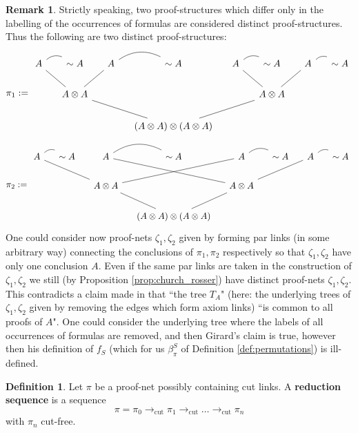 \documentclass[12pt]{article}
\theoremstyle{plain}
\theoremstyle{definition}
\newtheorem{defn}[thm]{Definition} %
\newtheorem{remark}[thm]{Remark}
\newcommand{\lto}{\longrightarrow}
\newcommand{\negation}{\sim}
\begin{document}
\begin{remark}
Strictly speaking, two proof-structures which differ only in the labelling of the occurrences of formulas are considered distinct proof-structures. Thus the following are two distinct proof-structures:
\begin{equation}\label{eq:counter_one}
\pi_1 :=
\begin{tikzcd}[column sep = small]
A\arrow[r,dash,bend left]\arrow[dr,dash] & \negation A & A\arrow[r,dash,bend left]\arrow[dl,dash] & \negation A & A\arrow[r,dash,bend left]\arrow[dr,dash] & \negation A & A\arrow[r,dash,bend left]\arrow[dl,dash] & \negation A\\
& A \otimes A\arrow[drr,dash] & & & &  A \otimes A\arrow[dll,dash]\\
& & & (A \otimes A) \otimes (A \otimes A)
\end{tikzcd}
\end{equation}
\begin{equation}\label{eq:counter_two}
\pi_2 :=
\begin{tikzcd}[column sep = small]
    A\arrow[r,dash,bend left]\arrow[drr,dash] & \negation A & A\arrow[r,dash,bend left]\arrow[drr,dash] & \negation A & A\arrow[r,dash,bend left]\arrow[dll,dash] & \negation A & A\arrow[r,dash,bend left]\arrow[dll,dash] & \negation A\\
    & & A \otimes A\arrow[dr,dash] & &  A \otimes A\arrow[dl,dash]\\
    & & & (A \otimes A) \otimes (A \otimes A)
    \end{tikzcd}
\end{equation}
One could consider now proof-nets $\zeta_1,\zeta_2$ given by forming par links (in some arbitrary way) connecting the conclusions of $\pi_1,\pi_2$ respectively so that $\zeta_1,\zeta_2$ have only one conclusion $A$. Even if the same par links are taken in the construction of $\zeta_1,\zeta_2$ we still (by Proposition \ref{prop:church_rosser}) have distinct proof-nets $\zeta_1,\zeta_2$. This contradicts a claim made in \cite{multiplicatives} that ``the tree $T_A$" (here: the underlying trees of $\zeta_1, \zeta_2$ given by removing the edges which form axiom links) ``is common to all proofs of $A$". One could consider the underlying tree where the labels of all occurrences of formulas are removed, and then Girard's claim is true, however then his definition of $f_S$ (which for us $\beta_\pi^S$ of Definition \ref{def:permutations}) is ill-defined.
\end{remark}
\begin{defn}
Let $\pi$ be a proof-net possibly containing cut links. A \textbf{reduction sequence} is a sequence
\begin{equation}
    \pi = \pi_0 \lto_{\operatorname{cut}} \pi_1 \lto_{\operatorname{cut}} \hdots \lto_{\operatorname{cut}} \pi_n
\end{equation}
with $\pi_n$ cut-free.
\end{defn}
\end{document}
